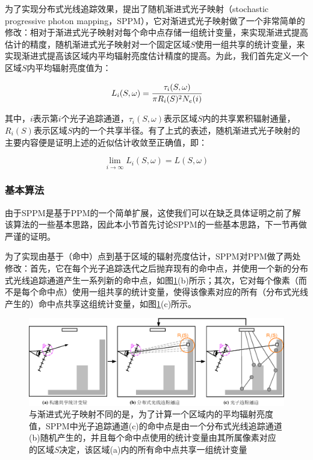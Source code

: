 为了实现分布式光线追踪效果，\cite{a:StochasticProgressivePhotonMapping}提出了随机渐进式光子映射（stochastic progressive photon mapping，SPPM），它对渐进式光子映射做了一个非常简单的修改：相对于渐进式光子映射对每个命中点存储一组统计变量，来实现渐进式提高估计的精度，随机渐进式光子映射对一个固定区域$S$使用一组共享的统计变量，来实现渐进式提高该区域内平均辐射亮度估计精度的提高。为此，我们首先定义一个区域$S$内平均辐射亮度值为：

\begin{equation}
	L_i(S,{\omega})= \cfrac{\tau_i(S,{\omega})}{\pi R_i(S)^{2}N_e(i)}
\end{equation}

\noindent 其中，$i$表示第$i$个光子追踪通道，$\tau_i(S,{\omega})$表示区域$S$内的共享累积辐射通量，$R_i(S)$表示区域$S$内的一个共享半径。有了上式的表述，随机渐进式光子映射的主要内容便是证明上述的近似估计收敛至正确值，即：

\begin{equation}
	\lim_{i\to\infty}L_i(S,{\omega})=L(S,{\omega})
\end{equation}





\subsubsection{基本算法}
由于SPPM是基于PPM的一个简单扩展，这使我们可以在缺乏具体证明之前了解该算法的一些基本思路，因此本小节首先讨论SPPM的一些基本思路，下一节再做严谨的证明。

为了实现由基于（命中）点到基于区域的辐射亮度估计，SPPM对PPM做了两处修改：首先，它在每个光子追踪迭代之后抛弃现有的命中点，并使用一个新的分布式光线追踪通道产生一系列新的命中点，如图\ref{f:pm-stochastic-pmm}(b)所示；其次，它对每个像素（而不是每个命中点）使用一组共享的统计变量，使得该像素对应的所有（分布式光线产生的）命中点共享这组统计变量，如图\ref{f:pm-stochastic-pmm}(c)所示。

\begin{figure}
\begin{fullwidth}
	\includegraphics[width=1.0\thewidth]{figures/pm/sppm}
	\caption{与渐进式光子映射不同的是，为了计算一个区域内的平均辐射亮度值，SPPM中光子追踪通道(c)的命中点是由一个分布式光线追踪通道(b)随机产生的，并且每个命中点使用的统计变量由其所属像素对应的区域$S$决定，该区域(a)内的所有命中点共享一组统计变量}
	\label{f:pm-stochastic-pmm}
\end{fullwidth}
\end{figure}

